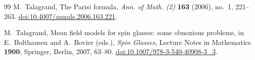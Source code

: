 \begin{thebibliography}{99}
M.~Talagrand,
\newblock The Parisi formula,
\newblock \emph{Ann. of Math. (2)} \textbf{163} (2006), no.~1, 221--263.
\newblock \href{https://doi.org/10.4007/annals.2006.163.221}{doi:10.4007/annals.2006.163.221}.

M.~Talagrand,
\newblock Mean field models for spin glasses: some obnoxious problems,
\newblock in E.~Bolthausen and A.~Bovier (eds.), \emph{Spin Glasses},
Lecture Notes in Mathematics \textbf{1900}, Springer, Berlin, 2007,
63--80.
\newblock \href{https://doi.org/10.1007/978-3-540-40908-3_3}{doi:10.1007/978-3-540-40908-3\_3}.

\end{thebibliography}
